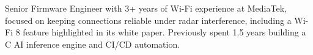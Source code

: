 

\begin{cvparagraph}

Senior Firmware Engineer with 3+ years of Wi-Fi experience at MediaTek, focused on keeping connections reliable under radar interference, including a Wi-Fi 8 feature highlighted in its white paper. Previously spent 1.5 years building a C AI inference engine and CI/CD automation.
\end{cvparagraph}
